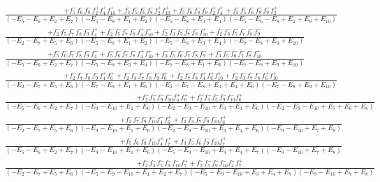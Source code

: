 \documentclass{article}
\begin{document}
\[\begin{array}{rcl}
\frac{+f_{5}^{-}f_{6}^{-}f_{8}^{-}f_{2}^{+}f_{4}^{+}f_{10}^{+}+f_{3}^{-}f_{5}^{-}f_{6}^{-}f_{8}^{-}f_{2}^{+}f_{10}^{+}+f_{5}^{-}f_{6}^{-}f_{8}^{-}f_{9}^{-}f_{2}^{+}f_{4}^{+}+f_{3}^{-}f_{5}^{-}f_{6}^{-}f_{8}^{-}f_{9}^{-}f_{2}^{+}}{(-E_{5}-E_{6}+E_{2}+E_{7})(-E_{5}-E_{8}+E_{1}+E_{2})(-E_{5}-E_{8}+E_{3}+E_{4})(-E_{5}-E_{6}-E_{8}+E_{2}+E_{9}+E_{10})}\\
\frac{+f_{2}^{-}f_{5}^{-}f_{7}^{-}f_{8}^{-}f_{9}^{-}f_{4}^{+}+f_{2}^{-}f_{5}^{-}f_{7}^{-}f_{8}^{-}f_{4}^{+}f_{10}^{+}+f_{2}^{-}f_{3}^{-}f_{5}^{-}f_{7}^{-}f_{8}^{-}f_{10}^{+}+f_{2}^{-}f_{3}^{-}f_{5}^{-}f_{7}^{-}f_{8}^{-}f_{9}^{-}}{(-E_{2}-E_{7}+E_{5}+E_{6})(-E_{5}-E_{8}+E_{1}+E_{2})(-E_{5}-E_{8}+E_{3}+E_{4})(-E_{7}-E_{8}+E_{9}+E_{10})}\\
\frac{+f_{5}^{-}f_{6}^{-}f_{7}^{-}f_{8}^{-}f_{9}^{-}f_{4}^{+}+f_{5}^{-}f_{6}^{-}f_{7}^{-}f_{8}^{-}f_{4}^{+}f_{10}^{+}+f_{3}^{-}f_{5}^{-}f_{6}^{-}f_{7}^{-}f_{8}^{-}f_{9}^{-}+f_{3}^{-}f_{5}^{-}f_{6}^{-}f_{7}^{-}f_{8}^{-}f_{10}^{+}}{(-E_{5}-E_{6}+E_{2}+E_{7})(-E_{5}-E_{8}+E_{3}+E_{4})(-E_{7}-E_{8}+E_{1}+E_{6})(-E_{7}-E_{8}+E_{9}+E_{10})}\\
\frac{+f_{2}^{-}f_{7}^{-}f_{8}^{-}f_{9}^{-}f_{4}^{+}f_{6}^{+}+f_{2}^{-}f_{3}^{-}f_{7}^{-}f_{8}^{-}f_{9}^{-}f_{6}^{+}+f_{2}^{-}f_{7}^{-}f_{8}^{-}f_{4}^{+}f_{6}^{+}f_{10}^{+}+f_{2}^{-}f_{3}^{-}f_{7}^{-}f_{8}^{-}f_{6}^{+}f_{10}^{+}}{(-E_{2}-E_{7}+E_{5}+E_{6})(-E_{7}-E_{8}+E_{1}+E_{6})(-E_{2}-E_{7}-E_{8}+E_{3}+E_{4}+E_{6})(-E_{7}-E_{8}+E_{9}+E_{10})}\\
\frac{+f_{2}^{-}f_{5}^{-}f_{9}^{-}f_{10}^{-}f_{4}^{+}f_{6}^{+}+f_{2}^{-}f_{3}^{-}f_{5}^{-}f_{9}^{-}f_{10}^{-}f_{6}^{+}}{(-E_{5}-E_{6}+E_{2}+E_{7})(-E_{9}-E_{10}+E_{1}+E_{6})(-E_{2}-E_{9}-E_{10}+E_{3}+E_{4}+E_{6})(-E_{2}-E_{9}-E_{10}+E_{5}+E_{6}+E_{8})}\\
\frac{+f_{2}^{-}f_{7}^{-}f_{9}^{-}f_{10}^{-}f_{4}^{+}f_{6}^{+}+f_{2}^{-}f_{3}^{-}f_{7}^{-}f_{9}^{-}f_{10}^{-}f_{6}^{+}}{(-E_{2}-E_{7}+E_{5}+E_{6})(-E_{9}-E_{10}+E_{1}+E_{6})(-E_{2}-E_{9}-E_{10}+E_{3}+E_{4}+E_{6})(-E_{9}-E_{10}+E_{7}+E_{8})}\\
\frac{+f_{5}^{-}f_{6}^{-}f_{9}^{-}f_{10}^{-}f_{4}^{+}f_{7}^{+}+f_{3}^{-}f_{5}^{-}f_{6}^{-}f_{9}^{-}f_{10}^{-}f_{7}^{+}}{(-E_{5}-E_{6}+E_{2}+E_{7})(-E_{9}-E_{10}+E_{1}+E_{6})(-E_{5}-E_{9}-E_{10}+E_{3}+E_{4}+E_{7})(-E_{9}-E_{10}+E_{7}+E_{8})}\\
\frac{+f_{2}^{-}f_{3}^{-}f_{5}^{-}f_{9}^{-}f_{10}^{-}f_{7}^{+}+f_{2}^{-}f_{5}^{-}f_{9}^{-}f_{10}^{-}f_{4}^{+}f_{7}^{+}}{(-E_{2}-E_{7}+E_{5}+E_{6})(-E_{5}-E_{9}-E_{10}+E_{1}+E_{2}+E_{7})(-E_{5}-E_{9}-E_{10}+E_{3}+E_{4}+E_{7})(-E_{9}-E_{10}+E_{7}+E_{8})}\\

\end{array}\]
\end{document}
